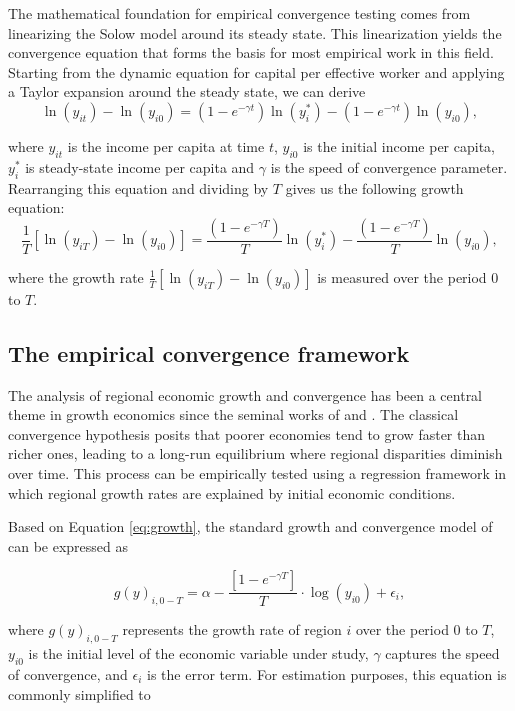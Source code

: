 \documentclass[smallextended, natbib]{svjour3}       %
\begin{document}
The mathematical foundation for empirical convergence testing comes from linearizing the Solow model around its steady state. 
This linearization yields the convergence equation that forms the basis for most empirical work in this field. 
Starting from the dynamic equation for capital per effective worker and applying a Taylor expansion around the steady state, we can derive
\begin{equation}
\ln(y_{it}) - \ln(y_{i0}) = (1 - e^{-\gamma t})\ln(y_i^*) - (1 - e^{-\gamma t})\ln(y_{i0}),
\end{equation}

\noindent where $y_{it}$ is the income per capita at time $t$, $y_{i0}$ is the initial income per capita, $y_i^*$ is steady-state income per capita and $\gamma$ is the speed of convergence parameter. 
Rearranging this equation and dividing by $T$ gives us the following growth equation:
\begin{equation}
\frac{1}{T}[\ln(y_{iT}) - \ln(y_{i0})] = \frac{(1 - e^{-\gamma T})}{T}\ln(y_i^*) - \frac{(1 - e^{-\gamma T})}{T}\ln(y_{i0}), \label{eq:growth}
\end{equation}

\noindent where the growth rate $\frac{1}{T}[\ln(y_{iT}) - \ln(y_{i0})]$ is measured over the period 0 to $T$.

\subsection{The empirical convergence framework}

The analysis of regional economic growth and convergence has been a central theme in growth economics since the seminal works of \cite{barro1991economic} and \cite{barro1992convergence}.
The classical convergence hypothesis posits that poorer economies tend to grow faster than richer ones, leading to a long-run equilibrium where regional disparities diminish over time. 
This process can be empirically tested using a regression framework in which regional growth rates are explained by initial economic conditions.

Based on Equation \ref{eq:growth}, the standard growth and convergence model of \cite{barro1992convergence} can be expressed as

\begin{equation}
g(y)_{i,0-T}=\alpha - \frac{[1- e^{-\gamma T}]}{T} \cdot \log(y_{i0})+ \epsilon_{i},
\label{eq:betafull}
\end{equation}

\noindent where $g(y)_{i,0-T}$ represents the growth rate of region $i$ over the period 0 to $T$, $y_{i0}$ is the initial level of the economic variable under study, $\gamma$ captures the speed of convergence, and $\epsilon_i$ is the error term. For estimation purposes, this equation is commonly simplified to
\end{document}
